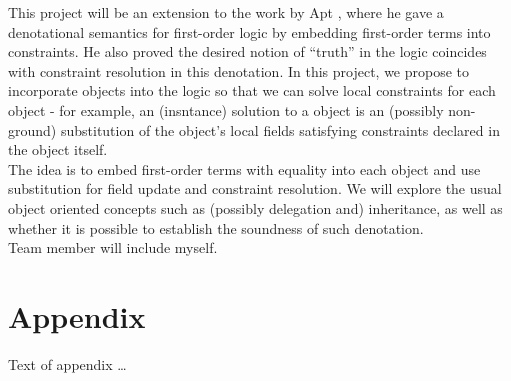 \documentclass[sigplan,10pt]{acmart}\settopmatter{}
\begin{document}
This project will be an extension to the work by Apt \cite{Apt2000}, where he
gave a denotational semantics for first-order logic by embedding first-order
terms into constraints. He also proved the desired notion of ``truth'' in the
logic coincides with constraint resolution in this denotation. In this project,
we propose to incorporate objects into the logic so that we can solve local
constraints for each object - for example, an (insntance) solution to a
object is an (possibly non-ground) substitution of the object's local fields
satisfying constraints declared in the object itself.\\

The idea is to embed first-order terms with equality into each object and use
substitution for field update and constraint resolution. We will explore the usual object
oriented concepts \cite{Abadi1996} such as (possibly delegation and)
inheritance, as well as whether it is possible to establish the soundness of
such denotation.\\

Team member will include myself.




%



\appendix
\section{Appendix}

Text of appendix \ldots



\end{document}

